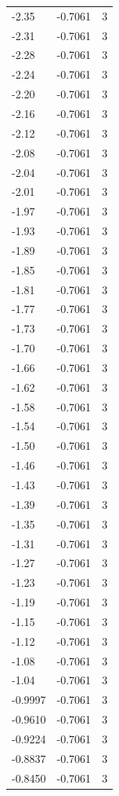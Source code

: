 \begin{longtable}{lrr}
  -2.35 & -0.7061 & 3 \\
  -2.31 & -0.7061 & 3 \\
  -2.28 & -0.7061 & 3 \\
  -2.24 & -0.7061 & 3 \\
  -2.20 & -0.7061 & 3 \\
  -2.16 & -0.7061 & 3 \\
  -2.12 & -0.7061 & 3 \\
  -2.08 & -0.7061 & 3 \\
  -2.04 & -0.7061 & 3 \\
  -2.01 & -0.7061 & 3 \\
  -1.97 & -0.7061 & 3 \\
  -1.93 & -0.7061 & 3 \\
  -1.89 & -0.7061 & 3 \\
  -1.85 & -0.7061 & 3 \\
  -1.81 & -0.7061 & 3 \\
  -1.77 & -0.7061 & 3 \\
  -1.73 & -0.7061 & 3 \\
  -1.70 & -0.7061 & 3 \\
  -1.66 & -0.7061 & 3 \\
  -1.62 & -0.7061 & 3 \\
  -1.58 & -0.7061 & 3 \\
  -1.54 & -0.7061 & 3 \\
  -1.50 & -0.7061 & 3 \\
  -1.46 & -0.7061 & 3 \\
  -1.43 & -0.7061 & 3 \\
  -1.39 & -0.7061 & 3 \\
  -1.35 & -0.7061 & 3 \\
  -1.31 & -0.7061 & 3 \\
  -1.27 & -0.7061 & 3 \\
  -1.23 & -0.7061 & 3 \\
  -1.19 & -0.7061 & 3 \\
  -1.15 & -0.7061 & 3 \\
  -1.12 & -0.7061 & 3 \\
  -1.08 & -0.7061 & 3 \\
  -1.04 & -0.7061 & 3 \\
  -0.9997 & -0.7061 & 3 \\
  -0.9610 & -0.7061 & 3 \\
  -0.9224 & -0.7061 & 3 \\
  -0.8837 & -0.7061 & 3 \\
  -0.8450 & -0.7061 & 3 \\

\end{longtable}
